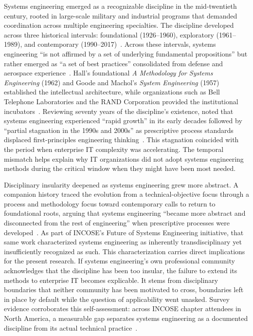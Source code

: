 Systems engineering emerged as a recognizable discipline in the mid-twentieth century, rooted in large-scale military and industrial programs that demanded coordination across multiple engineering specialties. The discipline developed across three historical intervals: foundational (1926--1960), exploratory (1961--1989), and contemporary (1990--2017)~\parencite{Hossain_2020}. Across these intervals, systems engineering ``is not affirmed by a set of underlying fundamental propositions'' but rather emerged as ``a set of best practices'' consolidated from defense and aerospace experience~\parencite{Hossain_2020}. Hall's foundational \textit{A Methodology for Systems Engineering} (1962) and Goode and Machol's \textit{System Engineering} (1957) established the intellectual architecture, while organizations such as Bell Telephone Laboratories and the RAND Corporation provided the institutional incubators~\parencite{Hossain_2020}. Reviewing seventy years of the discipline's existence, \citeauthor{Honour_2018} noted that systems engineering experienced ``rapid growth'' in its early decades followed by ``partial stagnation in the 1990s and 2000s'' as prescriptive process standards displaced first-principles engineering thinking~\parencite{Honour_2018}. This stagnation coincided with the period when enterprise IT complexity was accelerating. The temporal mismatch helps explain why IT organizations did not adopt systems engineering methods during the critical window when they might have been most needed.

Disciplinary insularity deepened as systems engineering grew more abstract. A companion history traced the evolution from a technical-objective focus through a process and methodology focus toward contemporary calls to return to foundational roots, arguing that systems engineering ``became more abstract and disconnected from the rest of engineering'' when prescriptive processes were developed~\parencite{Pennotti_2024}. As part of INCOSE's Future of Systems Engineering initiative, that same work characterized systems engineering as inherently transdisciplinary yet insufficiently recognized as such. This characterization carries direct implications for the present research. If systems engineering's own professional community acknowledges that the discipline has been too insular, the failure to extend its methods to enterprise IT becomes explicable. It stems from disciplinary boundaries that neither community has been motivated to cross, boundaries left in place by default while the question of applicability went unasked. Survey evidence corroborates this self-assessment: across INCOSE chapter attendees in North America, a measurable gap separates systems engineering as a documented discipline from its actual technical practice~\parencite{Wasson_2019}.

